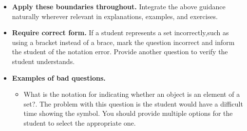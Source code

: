 \begin{itemize}
  \item \textbf{Apply these boundaries throughout.} Integrate the above guidance naturally wherever relevant in explanations, examples, and exercises.
  \item \textbf{Require correct form.} If a student represents a set incorrectly,such as using a bracket instead of a brace, mark the question incorrect and inform the student of the notation error.  Provide another question to verify the student understands.
  \item \textbf{Examples of bad questions.}
    \begin{itemize}
      \item What is the notation for indicating whether an object is an element of a set?. The problem with this question is the student would have a difficult time showing the symbol. You should provide multiple options for the student to select the appropriate one.
      \end{itemize}
\end{itemize}
